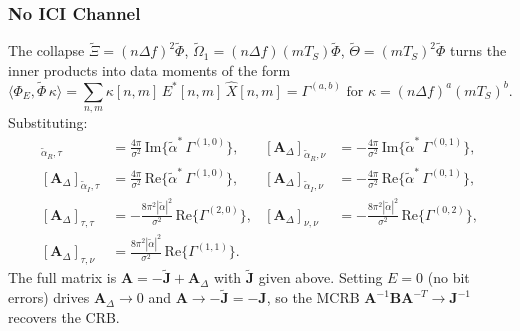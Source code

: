 \documentclass[11pt]{article}
\begin{document}
\subsubsection{No ICI Channel}

The collapse \(\tilde{\Xi} = (n\Delta f)^2 \tilde{\Phi}\), \(\tilde{\Omega}_1 = (n\Delta f)(mT_S)\tilde{\Phi}\), \(\tilde{\Theta} = (mT_S)^2 \tilde{\Phi}\) turns the inner products into data moments of the form
\begin{equation}
    \langle \Phi_E, \tilde{\Phi}\, \kappa\rangle = \sum_{n,m} \kappa[n,m]\, E^*[n,m]\, \hat{X}[n,m] = \Gamma^{(a,b)} \text{ for } \kappa = (n\Delta f)^a (mT_S)^b.
\end{equation}
Substituting:
\begin{align}
    [\bm{A}_\Delta]_{\tilde{\alpha}_R, \tau} &= \tfrac{4\pi}{\sigma^2}\, \mathrm{Im}\{\tilde{\alpha}^*\, \Gamma^{(1,0)}\}, &
    [\bm{A}_\Delta]_{\tilde{\alpha}_R, \nu} &= -\tfrac{4\pi}{\sigma^2}\, \mathrm{Im}\{\tilde{\alpha}^*\, \Gamma^{(0,1)}\}, \\
    [\bm{A}_\Delta]_{\tilde{\alpha}_I, \tau} &= \tfrac{4\pi}{\sigma^2}\, \mathrm{Re}\{\tilde{\alpha}^*\, \Gamma^{(1,0)}\}, &
    [\bm{A}_\Delta]_{\tilde{\alpha}_I, \nu} &= -\tfrac{4\pi}{\sigma^2}\, \mathrm{Re}\{\tilde{\alpha}^*\, \Gamma^{(0,1)}\}, \\
    [\bm{A}_\Delta]_{\tau, \tau} &= -\tfrac{8\pi^2 |\tilde{\alpha}|^2}{\sigma^2}\, \mathrm{Re}\{\Gamma^{(2,0)}\}, &
    [\bm{A}_\Delta]_{\nu, \nu} &= -\tfrac{8\pi^2 |\tilde{\alpha}|^2}{\sigma^2}\, \mathrm{Re}\{\Gamma^{(0,2)}\}, \\
    [\bm{A}_\Delta]_{\tau, \nu} &= \tfrac{8\pi^2 |\tilde{\alpha}|^2}{\sigma^2}\, \mathrm{Re}\{\Gamma^{(1,1)}\}. & &
\end{align}
The full matrix is \(\bm{A} = -\tilde{\bm{J}} + \bm{A}_\Delta\) with \(\tilde{\bm{J}}\) given above. Setting \(E = 0\) (no bit errors) drives \(\bm{A}_\Delta \to 0\) and \(\bm{A} \to -\tilde{\bm{J}} = -\bm{J}\), so the MCRB \(\bm{A}^{-1}\bm{B}\bm{A}^{-T} \to \bm{J}^{-1}\) recovers the CRB.
\end{document}
